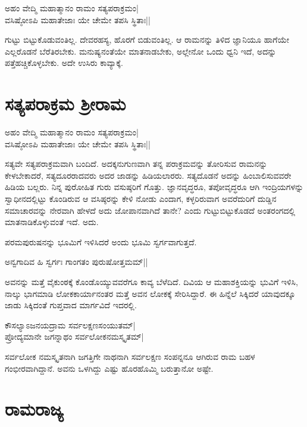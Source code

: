 \begin{shloka}
ಅಹಂ ವೇದ್ಮಿ ಮಹಾತ್ಮಾನಂ ರಾಮಂ ಸತ್ಯಪರಾಕ್ರಮಂ|\label{251a}\\
ವಸಿಷ್ಠೋಽಪಿ ಮಹಾತೇಜಾಃ ಯೇ ಚೇಮೇ ತಪಸಿ ಸ್ಥಿತಾಃ||
\end{shloka}

ಗುಟ್ಟು ಬಿಟ್ಟುಕೊಡುವಂತಿಲ್ಲ. ದೇವರಹಸ್ಯ, ಹೊರಗೆ ಬಿಡುವಂತಿಲ್ಲ. ಆ ರಾಮನನ್ನು ತಿಳಿದ ಜ್ಞಾನಿಯೂ ಹಾಗೆಯೇ ಎಲ್ಲರೊಡನೆ ಬೆರೆತಿರಬೇಕು. ಮನುಷ್ಯನಂತೆಯೇ ಮಾತನಾಡಬೇಕು, ಅಲ್ಲೇನೋ ಒಂದು ಧ್ವನಿ ಇದೆ, ಅದನ್ನು ಪತ್ತೆಹಚ್ಚಿಕೊಳ್ಳಬೇಕು. ಅದೇ ಉಸಿರು ಕಾವ್ಯಾಕ್ಕೆ. 

\section*{ಸತ್ಯಪರಾಕ್ರಮ ಶ್ರೀರಾಮ}

\begin{shloka}
ಅಹಂ ವೇದ್ಮಿ ಮಹಾತ್ಮಾನಂ ರಾಮಂ ಸತ್ಯಪರಾಕ್ರಮಂ|\\
ವಸಿಷ್ಠೋಽಪಿ ಮಹಾತೇಜಾಃ ಯೇ ಚೇಮೇ ತಪಸಿ ಸ್ಥಿತಾಃ||
\end{shloka}

ಸತ್ಯವೇ ಸತ್ಯಪರಾಕ್ರಮವಾಗಿ ಬಂದಿದೆ. ಅದಕ್ಕನುಗುಣವಾಗಿ ತನ್ನ ಪರಾಕ್ರಮವನ್ನು ತೋರಿಸುವ ರಾಮನನ್ನು ಕೇಳಬೇಕಾದರೆ, ಸತ್ಯದೂರರಾದವರು ಅದರ ಜಾಡನ್ನು ಹಿಡಿಯಲಾರರು. ಸತ್ಯದೊಡನೆ ಅದನ್ನು ಹಿಂಬಾಲಿಸುವವರೇ ಹಿಡಿಯ ಬಲ್ಲರು. ನಿನ್ನ ಪುರೋಹಿತ ಗುರು ವಸುಷ್ಠರಿಗೆ ಗೊತ್ತು. ಜ್ಞಾನವೃದ್ಧರೂ, ತಪೋವೃದ್ಧರೂ ಆಗಿ ಇಂದ್ರಿಯಗಳನ್ನು ಸ್ವಾಧೀನದಲ್ಲಿಟ್ಟು ಕೊಂಡಿರುವ ಆ ವಸಿಷ್ಠರನ್ನು ಕೇಳಿ ನೋಡು ಎಂದಾಗ, ಕಳ್ಳರಿರುವಾಗ ಅವರೆದುರಿಗೆ ದುಡ್ಡಿನ ಸಮಾಚಾರವನ್ನು ನೇರವಾಗಿ ಹೇಳದೆ ಅದು ಜೋಪಾನವಾಗಿದೆ ತಾನೇ? ಎಂದು ಗುಟ್ಟುಬಿಟ್ಟುಕೊಡದೆ ಅಂತರಂಗದಲ್ಲಿ ಮಾತನಾಡಿಕೊಳ್ಳುವಂತೆ ಇದೆ. ಅದು. 

ಪರಮಪುರುಷನನ್ನು ಭೂಮಿಗೆ ಇಳಿಸಿದರೆ ಅಂದು ಭೂಮಿ ಸ್ವರ್ಗವಾಗುತ್ತದೆ. 

\begin{shloka}
ಅನ್ವಗಾದಿವ ಹಿ ಸ್ವರ್ಗಃ ಗಾಂಗತಂ ಪುರುಷೋತ್ತಮಮ್||
\end{shloka}

ಅವನನ್ನು ಮತ್ತೆ ವೈಕುಂಠಕ್ಕೆ ಕೊಂಡೊಯ್ಯುವವರೆಗೂ ಕಾವ್ಯ ಬೆಳೆದಿದೆ. ದಿವಿಯ ಆ ಮಹಾಶಕ್ತಿಯನ್ನು ಭುವಿಗೆ ಇಳಿಸಿ, ನಾಲ್ಕು ಭಾಗಮಾಡಿ ಲೋಕಕಾರ್ಯಾನಂತರ ಮತ್ತೆ ಅವನ ಲೋಕಕ್ಕೆ ಸೇರಿಸಿದ್ದಾರೆ. ಈ ಹಿನ್ನೆಲೆ ಸಿಕ್ಕಿದರೆ ಯಾವುದಕ್ಕೂ ಜಾಡು ಸಿಕ್ಕಿದಂತೆ ಗುಪ್ತವಾದ ಮಾರ್ಗವಿದೆ ಇದರಲ್ಲಿ. 

\begin{shloka}
ಕೌಸಲ್ಯಾಽಜನಯದ್ರಾಮ‌ ಸರ್ವಲಕ್ಷಣಸಂಯುತಮ್|\label{252}\\
ಪ್ರೋದ್ಯಮಾನೇ ಜಗನ್ನಾಥಂ ಸರ್ವಲೋಕನಮಸ್ಕೃತಮ್|
\end{shloka}

ಸರ್ವಲೋಕ ನಮಸ್ಕೃತನಾಗಿ ಜಗತ್ತಿಗೇ ನಾಥನಾಗಿ ಸರ್ವಲಕ್ಷಣ ಸಂಪನ್ನನೂ ಆಗಿರುವ ರಾಮ ಬಹಳ ಗಂಭೀರವಾಗಿದ್ದಾನೆ. ಅವನು ಒಳಗಿದ್ದು ಎಷ್ಟು ಹೊರಹೊಮ್ಮಿ ಬರುತ್ತಾನೋ ಅಷ್ಟೇ. 

\section*{ರಾಮರಾಜ್ಯ}

